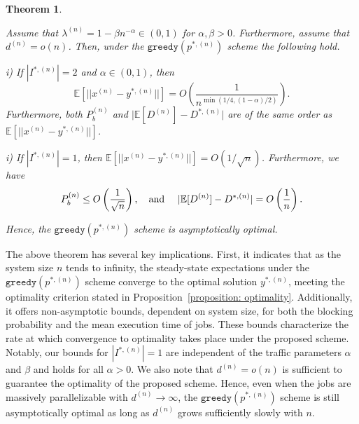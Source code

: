 \documentclass[a4paper]{article}
\theoremstyle{plain}
\newtheorem{thm}{Theorem}%
\theoremstyle{definition}
\theoremstyle{case}
\theoremstyle{remark}
\newcommand{\sbrac}[1]{\left[#1\right]}
\newcommand{\expect}[1]{\mathbb{E}\sbrac{#1}}
\newcommand{\abs}[1]{\lvert #1 \rvert}
\begin{document}
\begin{thm} 
\label{thm: main thm}

Assume that $\lambda^{(n)}=1-\beta n^{-\alpha} \in (0,1)$ for $\alpha,\beta >0$. Furthermore, assume that $d^{(n)}=o(n)$. Then, under the $\texttt{greedy}(p^{*,(n)})$ scheme the following hold. 
 \begin{description}
     
 \item{i)} If $|I^{*,(n)}|=2$ and $\alpha \in (0,1)$, then  $$\mathbb{E}[\vert\vert x^{(n)}-y^{*,(n)}\vert\vert]=O\left(\frac{1}{{n}^{\min(1/4,(1-\alpha)/2)}}\right).$$ 
 Furthermore, both $P_b^{(n)}$ and $\abs{\mathbb{E}[D^{(n)}] -D^{*,{(n)}}}$ are  of the same order as $\mathbb{E}[\vert\vert x^{(n)}-y^{*,(n)}\vert\vert]$.

\item{i)} If $|I^{*,(n)}|=1$, then $\mathbb{E}[\vert\vert x^{(n)}-y^{*,(n)}\vert\vert]=O(1/\sqrt{n})$. Furthermore, we have
    \begin{align}
        P_b^{(n)}  \leq O\left(\frac{1}{{\sqrt{n}}}\right),
        \text{\quad and \quad } \abs{\mathbb{E}[D^{(n)}] -D^{*,{(n)}}}= O\left(\frac{1}{{n}}\right).
    \end{align}
\end{description}
%
Hence, the $\texttt{greedy}(p^{*,(n)})$ scheme is asymptotically optimal.
\end{thm}
%
The above theorem has several key implications. First, it indicates that as the system size $n$ tends to infinity, the steady-state expectations under the $\texttt{greedy}(p^{*,(n)})$ scheme converge to the optimal solution $y^{*,(n)}$, meeting the optimality criterion stated in Proposition~\ref{proposition: optimality}. 
Additionally, it offers non-asymptotic bounds, dependent on system size, for both the blocking probability and the mean execution time of jobs. These bounds characterize the rate at which convergence to optimality takes place under the proposed scheme. Notably, our bounds for $|I^{*,(n)}|=1$ are independent of the traffic parameters $\alpha$ and $\beta$ and holds for all $\alpha > 0$. We also note that $d^{(n)}=o(n)$ is sufficient to guarantee the optimality of the proposed scheme. Hence, even when the jobs are massively parallelizable with $d^{(n)} \to \infty$, the $\texttt{greedy}(p^{*,(n)})$ scheme is still asymptotically optimal as long as $d^{(n)}$ grows sufficiently slowly with $n$.
\end{document}

